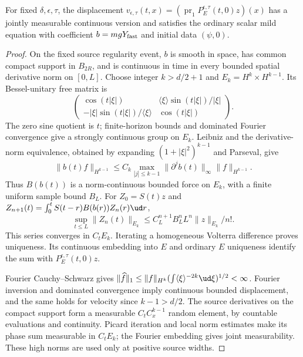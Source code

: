 \begin{lemma}\label{L:point-compact-source}
  For fixed $\delta,\epsilon,\tau$, the displacement
  $v_{\epsilon,\tau}(t,x)=(\operatorname{pr}_1P_E^{\epsilon,\tau}(t,0)z)(x)$
  has a jointly measurable continuous version and satisfies the ordinary
  scalar mild equation with coefficient $b=mgY_{\rm fast}$
  and initial data $(\psi,0)$.
\end{lemma}

\begin{proof}
  On the fixed source regularity event, $b$ is smooth in space,
  has common compact support in $B_{2R}$, and is continuous in time
  in every bounded spatial derivative norm on $[0,L]$.
  Choose integer $k>d/2+1$ and $E_k=H^k\times H^{k-1}$.
  Its Bessel-unitary free matrix is
  \[
    \begin{pmatrix}
      \cos(t|\xi|)&\langle\xi\rangle\sin(t|\xi|)/|\xi|\\
      -|\xi|\sin(t|\xi|)/\langle\xi\rangle&\cos(t|\xi|)
    \end{pmatrix}.
  \]
  The zero sine quotient is $t$; finite-horizon bounds and dominated
  Fourier convergence give a strongly continuous group on $E_k$.
  Leibniz and the derivative-norm equivalence, obtained by expanding
  $(1+|\xi|^2)^{k-1}$ and Parseval, give
  \[
    \|b(t)f\|_{H^{k-1}}
    \le C_k\max_{|j|\le k-1}\|\partial^jb(t)\|_\infty
    \|f\|_{H^{k-1}} .
  \]
  Thus $B(b(t))$ is a norm-continuous bounded force on $E_k$,
  with a finite uniform sample bound $B_L$.
  For $Z_0=S(t)z$ and
  $Z_{n+1}(t)=\int_0^tS(t-r)B(b(r))Z_n(r)\ud r$,
  \[
    \sup_{t\le L}\|Z_n(t)\|_{E_k}
    \le C_L^{n+1}B_L^nL^n\|z\|_{E_k}/n! .
  \]
  This series converges in $C_tE_k$.
  Iterating a homogeneous Volterra difference proves uniqueness.
  Its continuous embedding into $E$ and ordinary $E$ uniqueness
  identify the sum with $P_E^{\epsilon,\tau}(t,0)z$.

  Fourier Cauchy--Schwarz gives
  $\|\widehat f\|_1\le\|f\|_{H^k}
  (\int\langle\xi\rangle^{-2k}\ud\xi)^{1/2}<\infty$.
  Fourier inversion and dominated convergence imply continuous bounded
  displacement, and the same holds for velocity since $k-1>d/2$.
  The source derivatives on the compact support form a measurable
  $C_tC_x^{k-1}$ random element, by countable evaluations and continuity.
  Picard iteration and local norm estimates make its phase sum measurable
  in $C_tE_k$; the Fourier embedding gives joint measurability.
  These high norms are used only at positive source widths.


\end{proof}
